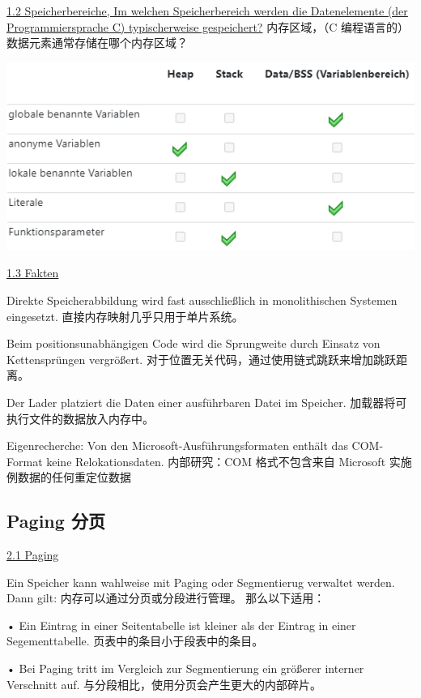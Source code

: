 \documentclass[fleqn]{article}
\begin{document}
\noindent\uline{1.2	Speicherbereiche, Im welchen Speicherbereich werden die Datenelemente (der Programmiersprache C) typischerweise gespeichert?}
内存区域，（C 编程语言的）数据元素通常存储在哪个内存区域？

\begin{center}
    \includegraphics{23.png}
\end{center}

\noindent\uline{1.3	Fakten}

Direkte Speicherabbildung wird fast ausschließlich in monolithischen Systemen eingesetzt.
直接内存映射几乎只用于单片系统。

Beim positionsunabhängigen Code wird die Sprungweite durch Einsatz von Kettensprüngen vergrößert.
对于位置无关代码，通过使用链式跳跃来增加跳跃距离。

Der Lader platziert die Daten einer ausführbaren Datei im Speicher.
加载器将可执行文件的数据放入内存中。

Eigenrecherche: Von den Microsoft-Ausführungsformaten enthält das COM-Format keine Relokationsdaten.
内部研究：COM 格式不包含来自 Microsoft 实施例数据的任何重定位数据




\subsection{Paging 分页}

\noindent\uline{2.1 Paging}

\noindent Ein Speicher kann wahlweise mit Paging oder Segmentierug verwaltet werden. Dann gilt:
内存可以通过分页或分段进行管理。 那么以下适用：

•	Ein Eintrag in einer Seitentabelle ist kleiner als der Eintrag in einer Segementtabelle.
页表中的条目小于段表中的条目。

•	Bei Paging tritt im Vergleich zur Segmentierung ein größerer interner Verschnitt auf.
与分段相比，使用分页会产生更大的内部碎片。
\end{document}
